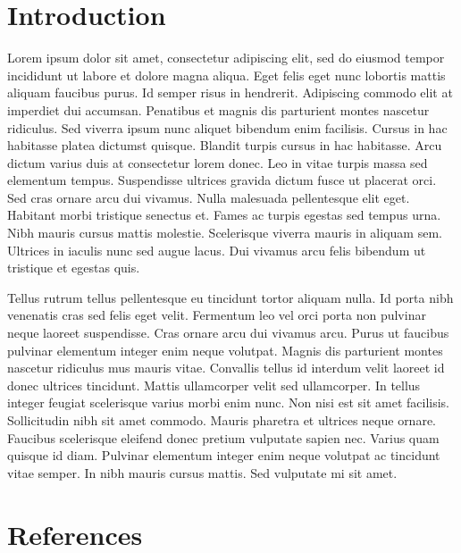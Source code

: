 \documentclass[11pt,]{article}
\begin{document}
\vskip -8.5pt



\noindent  

\hypertarget{introduction}{%
\section{Introduction}\label{introduction}}

Lorem ipsum dolor sit amet, consectetur adipiscing elit, sed do eiusmod tempor incididunt ut labore et dolore magna aliqua. Eget felis eget nunc lobortis mattis aliquam faucibus purus. Id semper risus in hendrerit. Adipiscing commodo elit at imperdiet dui accumsan. Penatibus et magnis dis parturient montes nascetur ridiculus. Sed viverra ipsum nunc aliquet bibendum enim facilisis. Cursus in hac habitasse platea dictumst quisque. Blandit turpis cursus in hac habitasse. Arcu dictum varius duis at consectetur lorem donec. Leo in vitae turpis massa sed elementum tempus. Suspendisse ultrices gravida dictum fusce ut placerat orci. Sed cras ornare arcu dui vivamus. Nulla malesuada pellentesque elit eget. Habitant morbi tristique senectus et. Fames ac turpis egestas sed tempus urna. Nibh mauris cursus mattis molestie. Scelerisque viverra mauris in aliquam sem. Ultrices in iaculis nunc sed augue lacus. Dui vivamus arcu felis bibendum ut tristique et egestas quis.

Tellus rutrum tellus pellentesque eu tincidunt tortor aliquam nulla. Id porta nibh venenatis cras sed felis eget velit. Fermentum leo vel orci porta non pulvinar neque laoreet suspendisse. Cras ornare arcu dui vivamus arcu. Purus ut faucibus pulvinar elementum integer enim neque volutpat. Magnis dis parturient montes nascetur ridiculus mus mauris vitae. Convallis tellus id interdum velit laoreet id donec ultrices tincidunt. Mattis ullamcorper velit sed ullamcorper. In tellus integer feugiat scelerisque varius morbi enim nunc. Non nisi est sit amet facilisis. Sollicitudin nibh sit amet commodo. Mauris pharetra et ultrices neque ornare. Faucibus scelerisque eleifend donec pretium vulputate sapien nec. Varius quam quisque id diam. Pulvinar elementum integer enim neque volutpat ac tincidunt vitae semper. In nibh mauris cursus mattis. Sed vulputate mi sit amet.

\hypertarget{references}{%
\section{References}\label{references}}

\setlength{\parindent}{-0.2in}
\setlength{\leftskip}{0.2in}
\setlength{\parskip}{8pt}

\noindent

\newpage
\singlespacing 
\end{document}
